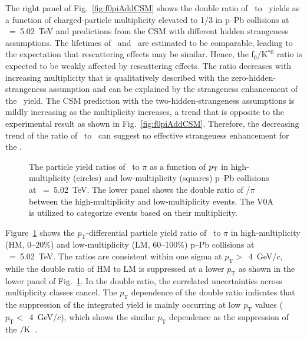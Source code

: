 The right panel of Fig.~\ref{fig:f0piAddCSM} shows the double ratio of \fzero~to \kstar~yields as a function of charged-particle multiplicity elevated to 1/3 in p--Pb collisions at \snn~=~5.02~TeV and predictions from the CSM with different hidden strangeness assumptions. The lifetimes of \fzero~and \kstar~are estimated to be comparable, leading to the expectation that rescattering effects may be similar. Hence, the f$_{0}$/K$^{*0}$ ratio is expected to be weakly affected by rescattering effects. The ratio decreases with increasing multiplicity that is qualitatively described with the zero-hidden-strangeness assumption and can be explained by the strangeness enhancement of the \kstar~yield. The CSM prediction with the two-hidden-strangeness assumptions is mildly increasing as the multiplicity increases, a trend that is opposite to the experimental result as shown in Fig.~\ref{fig:f0piAddCSM}. Therefore, the decreasing trend of the ratio of \fzero~to \kstar~can suggest no effective strangeness enhancement for the \fzero.

\begin{figure}[!hbt]
	\centering
	\caption{ The particle yield ratios of \fzero~to $\pi$ as a function of $p_{\rm{T}}$ in high-multiplicity (circles) and low-multiplicity (squares) p--Pb collisions at \snn~=~5.02~TeV. The lower panel shows the double ratio of \fzero/$\pi$ between the high-multiplicity and low-multiplicity events. The V0A is utilized to categorize events based on their multiplicity.}
	\label{fig:f0piPt}
\end{figure}

Figure~\ref{fig:f0piPt} shows the $p_{\mathrm{T}}$-differential particle yield ratio of \fzero~to $\pi$ in high-multiplicity (HM, 0--20\%) and low-multiplicity (LM, 60--100\%) p--Pb collisions at \snn~=~5.02~TeV. The ratios are consistent within one sigma at $p_{\mathrm{T}}>$~4~GeV/$c$, while the double ratio of HM to LM is suppressed at a lower $p_{\mathrm{T}}$ as shown in the lower panel of Fig.~\ref{fig:f0piPt}. In the double ratio, the correlated uncertainties across multiplicity classes cancel. The $p_{\mathrm{T}}$ dependence of the double ratio indicates that the suppression of the integrated yield is mainly occurring at low $p_{\mathrm{T}}$ values ($p_{\mathrm{T}}<$~4~GeV/$c$), which shows the similar $p_{\mathrm{T}}$ dependence as the suppression of the \kstar$\rm{}/K$~\cite{ALICE:2019etb}.

